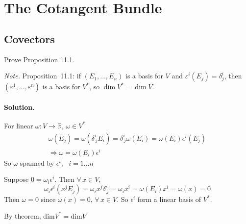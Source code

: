 \section{The Cotangent Bundle}

\subsection*{Covectors}

\begin{exercise}
Prove Proposition 11.1.
\end{exercise}
\noindent\emph{Note.} Proposition~11.1: if $(E_1,\ldots,E_n)$ is a basis for $V$ and $\varepsilon^i(E_j)=\delta^i_j$, then $(\varepsilon^1,\ldots,\varepsilon^n)$ is a basis for $V^*$, so $\dim V^*=\dim V$.
\paragraph{Solution.} For linear $\omega : V \to \mathbb{R}$, $\omega \in V^*$ 
\[
\begin{gathered}
\omega(E_j) = \omega( \delta^i_{ \, j} E_i) = \delta^i_{ \, j } \omega(E_i) = \omega(E_i) \epsilon^i(E_j) \\
\Longrightarrow \omega = \omega(E_i)\epsilon^i
\end{gathered}
\]
So $\omega$ spanned by $\epsilon^i$, \, $i = 1 \dots n$

Suppose $0 = \omega_i \epsilon^i$.  Then $\forall \, x \in V$, \[
\omega_i \epsilon^i(x^j E_j) = \omega_i x^j \delta^i_{ \, j } = \omega_i x^i = \omega(E_i) x^i = \omega(x) = 0 
\]
Then $\omega=0$ since $\omega(x) =0, \, \forall\, x \in V$.  So $\epsilon^i$ form a linear basis of $V^*$.  

By theorem, $\text{dim}{ V^*} = \text{dim}{V}$
